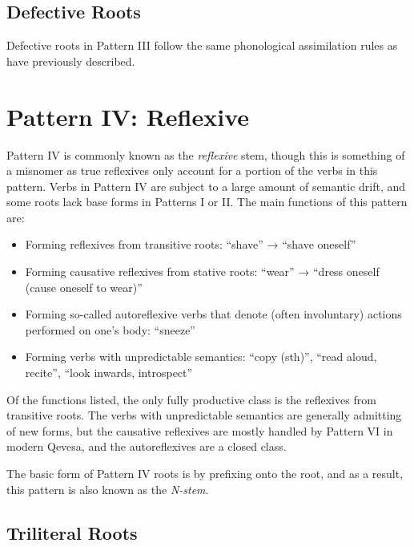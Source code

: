 \documentclass[grammar]{subfiles}
\begin{document}
\subsection{Defective Roots}
\label{ssec:vm_iii_defective_roots}

Defective roots in Pattern III follow the same phonological assimilation rules
as have previously described. 


\section{Pattern IV: Reflexive}
\label{sec:vm_pattern_iv}

Pattern IV is commonly known as the \emph{reflexive} stem, though this is
something of a misnomer as true reflexives only account for a portion of the
verbs in this pattern.  Verbs in Pattern IV are subject to a large amount of
semantic drift, and some roots lack base forms in Patterns I or II.  The main
functions of this pattern are: 

\begin{itemize}
  \item Forming reflexives from transitive roots:  “shave” → 
    “shave oneself”
  \item Forming causative reflexives from stative roots:  “wear” →
     “dress oneself (cause oneself to wear)”
  \item Forming so-called autoreflexive verbs that denote (often involuntary)
    actions performed on one’s body:  “sneeze”
  \item Forming verbs with unpredictable semantics:  “copy (sth)”,
     “read aloud, recite”,  “look inwards, introspect”
\end{itemize}

Of the functions listed, the only fully productive class is the reflexives from
transitive roots.  The verbs with unpredictable semantics are generally
admitting of new forms, but the causative reflexives are mostly handled by
Pattern VI in modern Qevesa, and the autoreflexives are a closed class.

The basic form of Pattern IV roots is by prefixing  onto the root, and as
a result, this pattern is also known as the \emph{N-stem}.


\subsection{Triliteral Roots}
\label{ssec:vm_iv_triliteral_roots}
\end{document}
